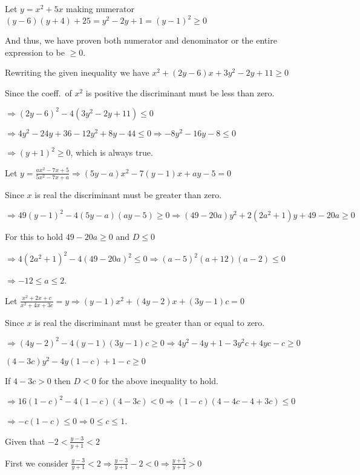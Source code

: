   Let $y = x^2 + 5x$ making numerator $(y - 6)(y + 4) + 25 = y^2 -2y + 1 = (y - 1)^2\geq 0$

  And thus, we have proven both numerator and denominator or the entire expression to be $\geq 0$.
\item Rewriting the given inequality we have $x^2 + (2y - 6)x + 3y^2 - 2y + 11 \geq 0$

  Since the coeff.\ of $x^2$ is positive the discriminant must be less than zero.

  $\Rightarrow (2y - 6)^2 - 4(3y^2 - 2y + 11) \leq 0$

  $\Rightarrow 4y^2 - 24y + 36 - 12y^2 + 8y - 44\leq 0 \Rightarrow -8y^2 - 16y -8 \leq 0$

  $\Rightarrow (y + 1)^2\geq 0$, which is always true.
\item Let $y = \frac{ax^2 - 7x + 5}{5x^2 - 7x + a}\Rightarrow (5y - a)x^2 -7(y - 1)x + ay - 5 = 0$

  Since $x$ is real the discriminant must be greater than zero.

  $\Rightarrow 49(y - 1)^2 - 4(5y - a)(ay - 5)\geq 0\Rightarrow (49 - 20a)y^2 + 2\left(2a^2 + 1\right)y + 49
  - 20a \geq 0$

  For this to hold $49 - 20a\geq 0$ and $D \leq 0$

  $\Rightarrow 4\left(2a^2 + 1\right)^2 - 4(49 - 20a)^2\leq 0 \Rightarrow (a - 5)^2(a + 12)(a - 2)\leq 0$

  $\Rightarrow -12\leq a\leq 2$.
\item Let $\frac{x^2 + 2x + c}{x^2 + 4x + 3c} = y \Rightarrow (y - 1)x^2 + (4y - 2)x + (3y - 1)c = 0$

  Since $x$ is real the discriminant must be greater than or equal to zero.

  $\Rightarrow (4y - 2)^2 - 4(y - 1)(3y - 1)c\geq 0\Rightarrow 4y^2 - 4y + 1 - 3y^2c + 4yc - c\geq 0$

  $(4 - 3c)y^2 -4y(1 - c) + 1 - c\geq 0$

  If $4 - 3c > 0$ then $D < 0$ for the above inequality to hold.

  $\Rightarrow 16(1 - c)^2 - 4(1 - c)(4 - 3c) < 0 \Rightarrow (1 - c)(4 - 4c - 4 + 3c) \leq 0$

  $\Rightarrow -c(1 - c)\leq 0 \Rightarrow 0\leq c\leq 1$.
\item Given that $-2< \frac{y - 3}{y + 1} < 2$

  First we consider $\frac{y - 3}{y + 1} < 2 \Rightarrow \frac{y - 3}{y + 1} - 2 < 0 \Rightarrow \frac{y +
    5}{y + 1} > 0$

